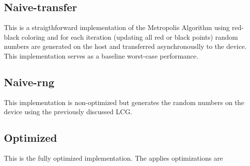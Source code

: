 \subsection{Naive-transfer}
  This is a straigthforward implementation of the Metropolis Algorithm using red-black coloring and for each iteration (updating all red or black points) random numbers are generated on the host and transferred asynchronouslly to the device.
  This implementation serves as a baseline worst-case performance.
\subsection{Naive-rng}
  This implementation is non-optimized but generates the random numbers on the device using the previously discussed LCG.
\subsection{Optimized}
  This is the fully optimized implementation. The applies optimizations are
